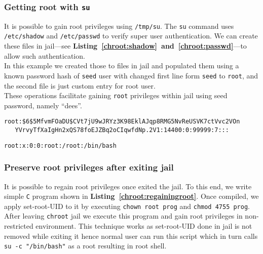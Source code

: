 \documentclass[12pt, a4paper, pdflatex]{article}
\begin{document}
\subsubsection{Getting root with \texttt{su}}
It is possible to gain root privileges using \texttt{/tmp/su}. The \texttt{su} command uses \texttt{/etc/shadow} and \texttt{/etc/passwd} to verify super user authentication. We can create these files in jail---see \textbf{Listing~\ref{chroot:shadow}~and~\ref{chroot:passwd}}---to allow such authentication.\\
In this example we created those to files in jail and populated them using a known password hash of \texttt{seed} user with changed first line form \texttt{seed} to \texttt{root}, and the second file is just custom entry for root user.\\
These operations facilitate gaining \texttt{root} privileges within jail using seed password, namely ``dees''. 

\vspace{1em}
\begin{lstlisting}
root:$6$5MfvmFOaDU$CVt7jU9wJRYz3K98EklAJqp8RMG5NvReUSVK7ctVvc2VOn
   YVrvyTfXaIgHn2xQS78foEJZBq2oCIqwfdNp.2V1:14400:0:99999:7:::
\end{lstlisting}
\vspace{1em}
\begin{lstlisting}
root:x:0:0:root:/root:/bin/bash
\end{lstlisting}

\subsubsection{Preserve root privileges after exiting jail}
It is possible to regain root privileges once exited the jail. To this end, we write simple \texttt{C} program shown in \textbf{Listing~\ref{chroot:regainingroot}}. Once compiled, we apply set-root-UID to it by executing \texttt{chown root prog} and \texttt{chmod 4755 prog}.\\
After leaving \texttt{chroot} jail we execute this program and gain root privileges in non-restricted environment. This technique works as set-root-UID done in jail is not removed while exiting it hence normal user can run this script which in turn calls \texttt{su -c "/bin/bash"} as a root resulting in root shell.
\end{document}
